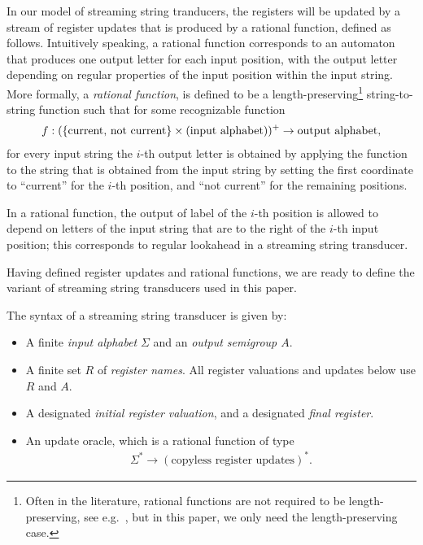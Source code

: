In our model of streaming string tranducers, the registers will be updated by a stream of register updates that is produced by a {rational function}, defined as follows.  Intuitively speaking, a rational function corresponds to an automaton that produces one output letter for each input position, with the output letter depending on regular properties of the input position within the input string. More formally, a \emph{rational function}, is defined to be a length-preserving\footnote{ Often in the literature, rational functions are not required to be length-preserving, see e.g.~\cite[p.~525]{sakarovitch2009elements}, but in this paper, we only need the length-preserving case.} string-to-string function such that for some recognizable function 
\begin{align*}
 f : (\{\text{current, not current}\} \times \text{(input alphabet)})^+ \to \text{output alphabet},
\end{align*}
for every input string the  $i$-th output letter is obtained by applying the function
to the string that is obtained from the input string by setting the first coordinate to ``current'' for the $i$-th position, and ``not current'' for the remaining positions.  

In a rational function, the output of label of the $i$-th position is allowed to depend on letters of the input string that are to the right of the $i$-th input position; this corresponds to regular lookahead in a streaming string transducer. 

Having defined register updates and rational functions, we are ready to define the variant of streaming string transducers used in this paper.



\begin{definition}\label{def:usual-sst}
    The syntax of a streaming string transducer is given by:
\begin{itemize}
    \item A finite \emph{input alphabet} $\Sigma$ and an \emph{output semigroup $A$}.
    \item A finite set $R$ of \emph{register names}. All register valuations and updates below use $R$ and $A$.
    \item A designated \emph{initial register valuation}, and a designated \emph{final register}.
    \item An update oracle, which is a rational function of type 
    \begin{align*}
    \Sigma^* \to (\text{copyless register updates})^*.
    \end{align*}
\end{itemize}
\end{definition}

